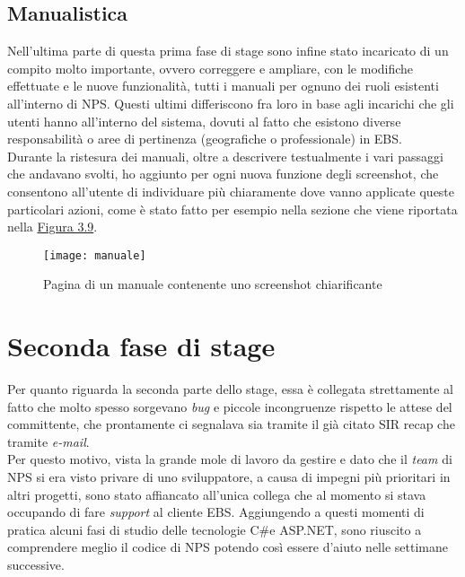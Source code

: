 \subsection{Manualistica}
\label{manuali}
Nell'ultima parte di questa prima fase di stage sono infine stato incaricato di un compito molto importante, ovvero correggere e ampliare, con le modifiche effettuate e le nuove funzionalità, tutti i manuali per ognuno dei ruoli esistenti all'interno di NPS. Questi ultimi differiscono fra loro in base agli incarichi che gli utenti hanno all'interno del sistema, dovuti al fatto che esistono diverse responsabilità o aree di pertinenza (geografiche o professionale) in EBS. \\
Durante la ristesura dei manuali, oltre a descrivere testualmente i vari passaggi che andavano svolti, ho aggiunto per ogni nuova funzione degli \gls{screenshot}, che consentono all'utente di individuare più chiaramente dove vanno applicate queste particolari azioni, come è stato fatto per esempio nella sezione che viene riportata nella \hyperref[manuale]{Figura 3.9}.

\begin{figure}[h!]
\begin{center}
\texttt{[image: manuale]}
\caption{Pagina di un manuale contenente uno screenshot chiarificante}
\label{manuale}
\end{center}
\end{figure}
\FloatBarrier
 
\newpage
\section{Seconda fase di stage}
\label{seconda fase}
Per quanto riguarda la seconda parte dello stage, essa è collegata strettamente al fatto che molto spesso sorgevano \textit{bug} e piccole incongruenze rispetto le attese del committente, che prontamente ci segnalava sia tramite il già citato SIR recap che tramite \textit{e-mail}. \\
Per questo motivo, vista la grande mole di lavoro da gestire e dato che il \textit{team} di NPS si era visto privare di uno sviluppatore, a causa di impegni più prioritari in altri progetti, sono stato affiancato all'unica collega che al momento si stava occupando di fare \textit{support} al cliente EBS. Aggiungendo a questi momenti di pratica alcuni fasi di studio delle tecnologie C\#\footnotemark[4] e ASP.NET\footnotemark[4]
, sono riuscito a comprendere meglio il codice di NPS potendo così essere d'aiuto nelle settimane successive. 

